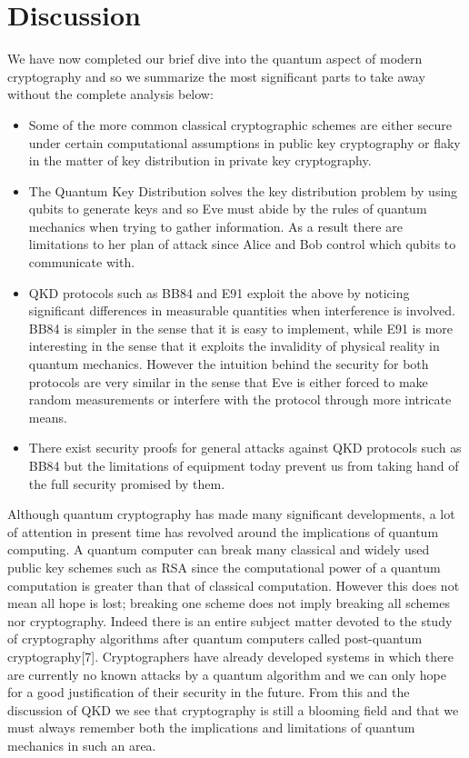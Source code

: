 \documentclass[aps,prd,final,twocolumn,letterpaper]{revtex4}
\begin{document}
\section{Discussion}
We have now completed our brief dive into the quantum aspect of modern cryptography and so we summarize the most significant parts to take away without the complete analysis below: 
\begin{itemize}
\item Some of the more common classical cryptographic schemes are either secure under certain computational assumptions in public key cryptography or flaky in the matter of key distribution in private key cryptography. 
\item The Quantum Key Distribution solves the key distribution problem by using qubits to generate keys and so Eve must abide by the rules of quantum mechanics when trying to gather information. As a result there are limitations to her plan of attack since Alice and Bob control which qubits to communicate with. 
\item QKD protocols such as BB84 and E91 exploit the above by noticing significant differences in measurable quantities when interference is involved. BB84 is simpler in the sense that it is easy to implement, while E91 is more interesting in the sense that it exploits the invalidity of physical reality in quantum mechanics. However the intuition behind the security for both protocols are very similar in the sense that Eve is either forced to make random measurements or interfere with the protocol through more intricate means.
\item There exist security proofs for general attacks against QKD protocols such as BB84 but the limitations of equipment today prevent us from taking hand of the full security promised by them.
\end{itemize}
Although quantum cryptography has made many significant developments, a lot of attention in present time has revolved around the implications of quantum computing. A quantum computer can break many classical and widely used public key schemes such as RSA since the computational power of a quantum computation is greater than that of classical computation. However this does not mean all hope is lost; breaking one scheme does not imply breaking all schemes nor cryptography. Indeed there is an entire subject matter devoted to the study of cryptography algorithms after quantum computers called post-quantum cryptography[7]. Cryptographers have already developed systems in which there are currently no known attacks by a quantum algorithm and we can only hope for a good justification of their security in the future. From this and the discussion of QKD we see that cryptography is still a blooming field and that we must always remember both the implications and limitations of quantum mechanics in such an area.
\end{document}
